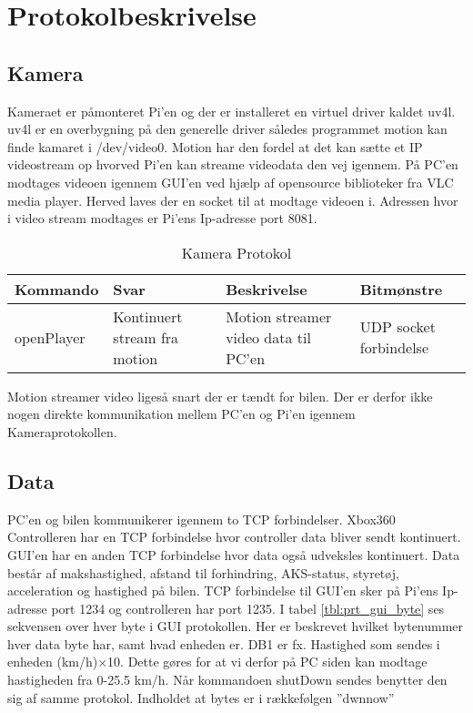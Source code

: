 \section{Protokolbeskrivelse}

\subsection{Kamera}

Kameraet er påmonteret Pi'en og der er installeret en virtuel driver kaldet uv4l. uv4l er en overbygning på den generelle driver således programmet motion kan finde kamaret i /dev/video0. Motion har den fordel at det kan sætte et IP videostream op hvorved Pi’en kan streame videodata den vej igennem. På PC'en modtages videoen igennem GUI'en ved hjælp af opensource biblioteker fra VLC media player. Herved laves der en socket til at modtage videoen i. Adressen hvor i video stream modtages er Pi'ens Ip-adresse port 8081.

\begin{table}[ht]
	\begin{tabularx}{\textwidth}{| Z | Z | Z | Z |} \hline
		\textbf{Kommando} 						&
		\textbf{Svar}							&
		\textbf{Beskrivelse}					&
		\textbf{Bitmønstre}						\\ \hline

		openPlayer								&
		Kontinuert stream fra motion			&
		Motion streamer video data til PC'en	&
		UDP socket forbindelse					\\ \hline

		\end{tabularx}
	\caption{Kamera Protokol}
	\label{tbl:prt_cam}
\end{table}

Motion streamer video ligeså snart der er tændt for bilen. Der er derfor ikke nogen direkte kommunikation mellem PC'en og Pi'en igennem Kameraprotokollen.


\subsection{Data}

PC'en og bilen kommunikerer igennem to TCP forbindelser. Xbox360 Controlleren har en TCP forbindelse hvor controller data bliver sendt kontinuert. GUI'en har en anden TCP forbindelse hvor data også udveksles kontinuert. Data består af makshastighed, afstand til forhindring, AKS-status,  styretøj, acceleration og hastighed på bilen. TCP forbindelse til GUI'en sker på Pi'ens Ip-adresse port 1234 og controlleren har port 1235.
I tabel \ref{tbl:prt_gui_byte} ses sekvensen over hver byte i GUI protokollen. Her er beskrevet hvilket bytenummer hver data byte har, samt hvad enheden er. DB1 er fx. Hastighed som sendes i enheden (km/h)$\times$10. Dette gøres for at vi derfor på PC siden kan modtage hastigheden fra 0-25.5 km/h. Når kommandoen shutDown sendes benytter den sig af samme protokol. Indholdet at bytes er i rækkefølgen ''dwnnow''

